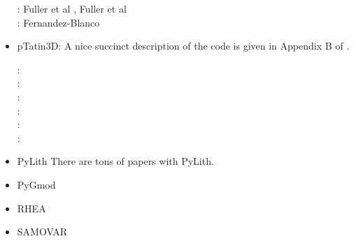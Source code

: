 \begin{itemize}
\begin{scriptsize}
\twothousandsix: Fuller et al \cite{fuwb06}, Fuller et al \cite{fuwf06}\\
\twothousandtwenty: Fernandez-Blanco \cite{femb20}
\end{scriptsize}

\item pTatin3D: A nice succinct description of the code is given in Appendix B of \cite{lemh17}. 

\begin{scriptsize}
\twothousandthirteen: \cite{phil13}\\
\twothousandfourteen: \cite{mabl14}\\
\twothousandfifteen: \cite{mabl15}\\
\twothousandseventeen: \cite{lemh17}\cite{magm17}\\
\twothousandeighteen: \cite{jolp18}\\
\twothousandnineteen: \cite{jolm19}
\end{scriptsize}

\item PyLith 
There are tons of papers with PyLith. 

{\small
\noindent
\cite{aakw13}
}

\item PyGmod 

{\small
\noindent
\cite{crvs15}
}


\item RHEA 

{\small
\noindent
\cite{bugg08}
\cite{stgb10}
\cite{algs12}
\cite{busa13}
}

\item SAMOVAR


\end{itemize}
